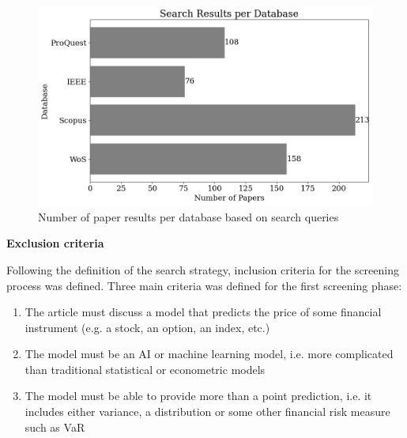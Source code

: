 \begin{figure}[H]
    \centering
    \includegraphics[width=1\linewidth]{Images/search_sample_by_database.png}
    \caption{Number of paper results per database based on search queries}
    \label{fig:search_sample_by_database}
\end{figure}



\textbf{Exclusion criteria}\nopagebreak

Following the definition of the search strategy, inclusion criteria for the screening process was defined. Three main criteria was defined for the first screening phase:

\begin{enumerate}
    \item The article must discuss a model that predicts the price of some financial instrument (e.g. a stock, an option, an index, etc.)
    \item The model must be an AI or machine learning model, i.e. more complicated than traditional statistical or econometric models
    \item The model must be able to provide more than a point prediction, i.e. it includes either variance, a distribution or some other financial risk measure such as VaR
\end{enumerate}

